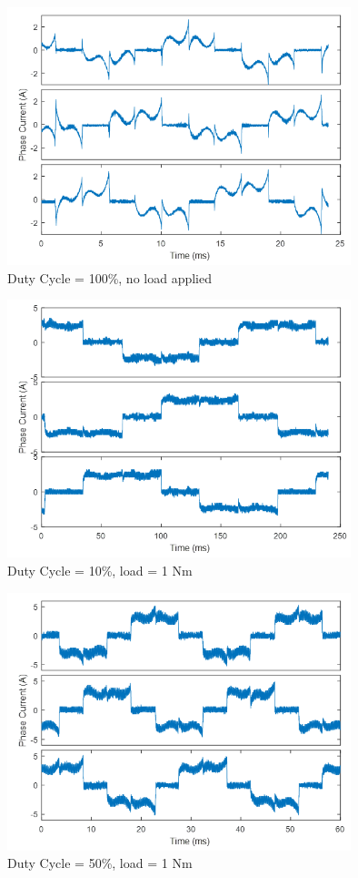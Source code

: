 \begin{figure}[h!p]
\centering
\includegraphics[width=10cm]{Images/waveforms/trap_curr_3.png} 
\caption[trapc3]{Duty Cycle = 100\%, no load applied}
\label{fig:trapc3}
\end{figure}

\begin{figure}[h!p]
\centering
\includegraphics[width=10cm]{Images/waveforms/trap_curr_4.png} 
\caption[trapc4]{Duty Cycle = 10\%, load = 1 Nm}
\label{fig:trapc4}
\end{figure}

\begin{figure}[h!p]
\centering
\includegraphics[width=10cm]{Images/waveforms/trap_curr_5.png} 
\caption[trapc5]{Duty Cycle = 50\%, load = 1 Nm}
\label{fig:trapc5}
\end{figure}

